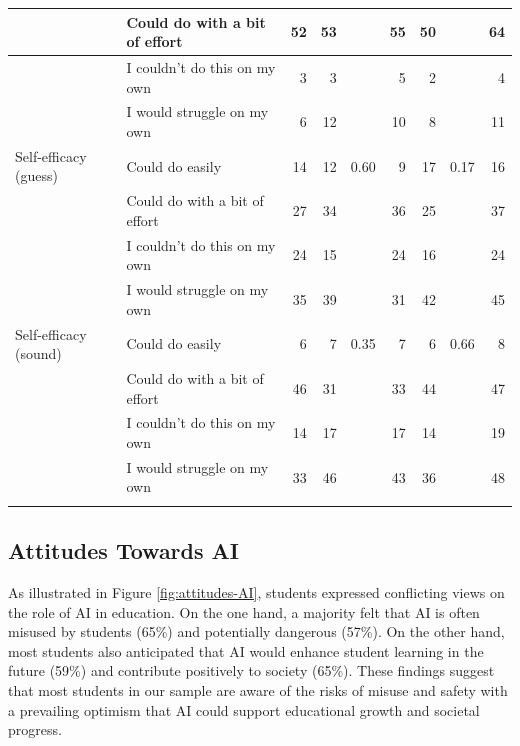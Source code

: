 \documentclass[
  12pt,
]{article}
\begin{document}
\begin{table}
\begin{tabular}[t]{llrrlrrlr}
\hline
 & Could do with a bit of effort & 52 & 53 &  & 55 & 50 &  & 64\\
\hline
 & I couldn't do this on my own & 3 & 3 &  & 5 & 2 &  & 4\\
\hline
 & I would struggle on my own & 6 & 12 &  & 10 & 8 &  & 11\\
\hline
Self-efficacy (guess) & Could do easily & 14 & 12 & 0.60 & 9 & 17 & 0.17 & 16\\
\hline
 & Could do with a bit of effort & 27 & 34 &  & 36 & 25 &  & 37\\
\hline
 & I couldn't do this on my own & 24 & 15 &  & 24 & 16 &  & 24\\
\hline
 & I would struggle on my own & 35 & 39 &  & 31 & 42 &  & 45\\
\hline
Self-efficacy (sound) & Could do easily & 6 & 7 & 0.35 & 7 & 6 & 0.66 & 8\\
\hline
 & Could do with a bit of effort & 46 & 31 &  & 33 & 44 &  & 47\\
\hline
 & I couldn't do this on my own & 14 & 17 &  & 17 & 14 &  & 19\\
\hline
 & I would struggle on my own & 33 & 46 &  & 43 & 36 &  & 48\\
\arrayrulecolor{black}\bottomrule
\end{tabular}
\end{table}

\subsection{Attitudes Towards AI}\label{attitudes-towards-ai}

As illustrated in Figure \ref{fig:attitudes-AI}, students expressed conflicting views on the role of AI in education. On the one hand, a majority felt that AI is often misused by students (65\%) and potentially dangerous (57\%). On the other hand, most students also anticipated that AI would enhance student learning in the future (59\%) and contribute positively to society (65\%). These findings suggest that most students in our sample are aware of the risks of misuse and safety with a prevailing optimism that AI could support educational growth and societal progress.
\end{document}
